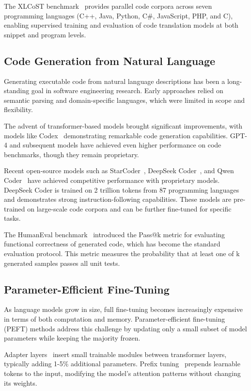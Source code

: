 \documentclass[conference]{IEEEtran}
\begin{document}
The XLCoST benchmark~\cite{xlcost2022} provides parallel code corpora across seven programming languages (C++, Java, Python, C\#, JavaScript, PHP, and C), enabling supervised training and evaluation of code translation models at both snippet and program levels.

\subsection{Code Generation from Natural Language}

Generating executable code from natural language descriptions has been a long-standing goal in software engineering research. Early approaches relied on semantic parsing and domain-specific languages, which were limited in scope and flexibility.

The advent of transformer-based models brought significant improvements, with models like Codex~\cite{chen2021codex} demonstrating remarkable code generation capabilities. GPT-4 and subsequent models have achieved even higher performance on code benchmarks, though they remain proprietary.

Recent open-source models such as StarCoder~\cite{starcoder2023}, DeepSeek Coder~\cite{deepseek2024}, and Qwen Coder~\cite{qwen2024} have achieved competitive performance with proprietary models. DeepSeek Coder is trained on 2 trillion tokens from 87 programming languages and demonstrates strong instruction-following capabilities. These models are pre-trained on large-scale code corpora and can be further fine-tuned for specific tasks.

The HumanEval benchmark~\cite{chen2021codex} introduced the Pass@k metric for evaluating functional correctness of generated code, which has become the standard evaluation protocol. This metric measures the probability that at least one of k generated samples passes all unit tests.

\subsection{Parameter-Efficient Fine-Tuning}

As language models grow in size, full fine-tuning becomes increasingly expensive in terms of both computation and memory. Parameter-efficient fine-tuning (PEFT) methods address this challenge by updating only a small subset of model parameters while keeping the majority frozen.

Adapter layers~\cite{houlsby2019adapters} insert small trainable modules between transformer layers, typically adding 1-5\% additional parameters. Prefix tuning~\cite{li2021prefix} prepends learnable tokens to the input, modifying the model's attention patterns without changing its weights.
\end{document}
